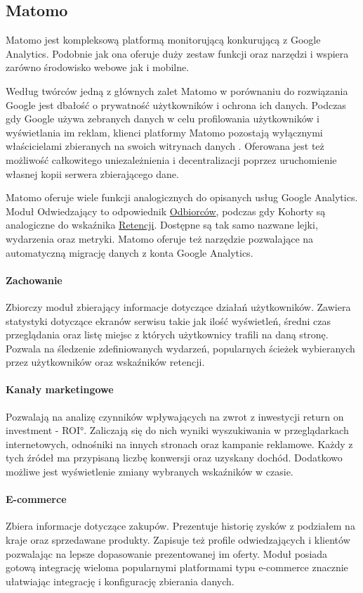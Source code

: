 \subsection{Matomo}
\label{sec:matomo}
Matomo jest kompleksową platformą monitorującą konkurującą z Google Analytics. Podobnie jak ona oferuje duży zestaw funkcji oraz narzędzi i wspiera zarówno środowisko webowe jak i mobilne. 

Według twórców jedną z głównych zalet Matomo w porównaniu do rozwiązania Google jest dbałość o prywatność użytkowników i ochrona ich danych. Podczas gdy Google używa zebranych danych w celu profilowania użytkowników i wyświetlania im reklam, klienci platformy Matomo pozostają wyłącznymi właścicielami zbieranych na swoich witrynach danych \cite{Matomo_Data}. Oferowana jest też możliwość całkowitego uniezależnienia i decentralizacji poprzez uruchomienie własnej kopii serwera zbierającego dane.

Matomo oferuje wiele funkcji analogicznych do opisanych usług Google Analytics. Moduł Odwiedzający to odpowiednik \hyperref[par:ga-audiences]{Odbiorców}, podczas gdy Kohorty są analogiczne do wskaźnika \hyperref[par:ga-retention]{Retencji}. Dostępne są tak samo nazwane lejki, wydarzenia oraz metryki. Matomo oferuje też narzędzie pozwalające na automatyczną migrację danych z konta Google Analytics.

\paragraph{Zachowanie}
Zbiorczy moduł zbierający informacje dotyczące działań użytkowników. Zawiera statystyki dotyczące ekranów serwisu takie jak ilość wyświetleń, średni czas przeglądania oraz listę miejsc z których użytkownicy trafili na daną stronę. Pozwala na śledzenie zdefiniowanych wydarzeń, popularnych ścieżek wybieranych przez użytkowników oraz wskaźników retencji.

\paragraph{Kanały marketingowe}
Pozwalają na analizę czynników wpływających na zwrot z inwestycji \ang{return on investment - ROI}. Zaliczają się do nich wyniki wyszukiwania w przeglądarkach internetowych, odnośniki na innych stronach oraz kampanie reklamowe. Każdy z tych źródeł ma przypisaną liczbę konwersji oraz uzyskany dochód. Dodatkowo możliwe jest wyświetlenie zmiany wybranych wskaźników w czasie.

\paragraph{E-commerce}
Zbiera informacje dotyczące zakupów. Prezentuje historię zysków z podziałem na kraje oraz sprzedawane produkty. Zapisuje też profile odwiedzających i klientów pozwalając na lepsze dopasowanie prezentowanej im oferty. Moduł posiada gotową integrację wieloma popularnymi platformami typu e-commerce znacznie ułatwiając integrację i konfigurację zbierania danych.

